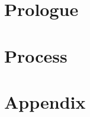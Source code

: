 
\part{Prologue} %

% 


\cleardoublepage %


\part{Process} %







\part{Appendix} %

\appendix

